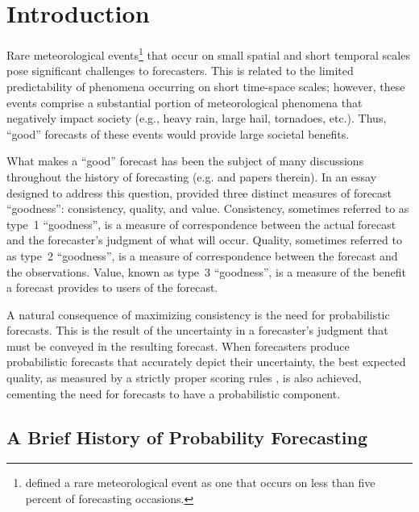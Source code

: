 

\chapter{Introduction}
\label{intro}

Rare meteorological events\footnote{\cite{Murphy1991} defined a rare meteorological event as one that occurs on less than five percent of forecasting occasions.} that occur on small spatial and short temporal scales pose significant challenges to forecasters.
This is related to the limited predictability of phenomena occurring on short time-space scales; however, these events comprise a substantial portion of meteorological phenomena that negatively impact society (e.g., heavy rain, large hail, tornadoes, etc.).
Thus, ``good'' forecasts of these events would provide large societal benefits.


What makes a ``good'' forecast has been the subject of many discussions throughout the history of forecasting (e.g. \citealp{Peirce1884, Clayton1889, Nichols1890, Mascart1922, Winkler1968, Murphy1993, Murphy1996} and papers therein).
In an essay designed to address this question, \cite{Murphy1993} provided three distinct measures of forecast ``goodness'': consistency, quality, and value.
Consistency, sometimes referred to as \mbox{type 1} ``goodness'', is a measure of correspondence between the actual forecast and the forecaster's judgment of what will occur.
Quality, sometimes referred to as \mbox{type 2} ``goodness'', is a measure of correspondence between the forecast and the observations.
Value, known as \mbox{type 3} ``goodness'', is a measure of the benefit a forecast provides to users of the forecast.


A natural consequence of maximizing consistency is the need for probabilistic forecasts.
This is the result of the uncertainty in a forecaster's judgment that must be conveyed in the resulting forecast.
When forecasters produce probabilistic forecasts that accurately depict their uncertainty, the best expected quality, as measured by a strictly proper scoring rules \citep{Winkler1968}, is also achieved, cementing the need for forecasts to have a probabilistic component.




\section{A Brief History of Probability Forecasting}

